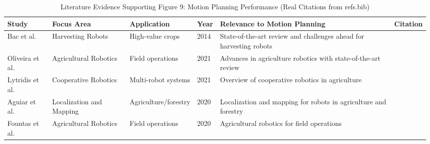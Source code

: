 \begin{table*}[htbp]
\centering
\small
\caption{Literature Evidence Supporting Figure 9: Motion Planning Performance (Real Citations from refs.bib)}
\label{tab:figure9_real_support}
\begin{tabular}{p{}p{}p{}p{}p{}p{}}
\toprule
\textbf{Study} & \textbf{Focus Area} & \textbf{Application} & \textbf{Year} & \textbf{Relevance to Motion Planning} & \textbf{Citation} \\ \midrule

Bac et al. & Harvesting Robots & High-value crops & 2014 & State-of-the-art review and challenges ahead for harvesting robots & \cite{bac2014harvesting} \\

Oliveira et al. & Agricultural Robotics & Field operations & 2021 & Advances in agriculture robotics with state-of-the-art review & \cite{oliveira2021advances} \\

Lytridis et al. & Cooperative Robotics & Multi-robot systems & 2021 & Overview of cooperative robotics in agriculture & \cite{lytridis2021overview} \\

Aguiar et al. & Localization and Mapping & Agriculture/forestry & 2020 & Localization and mapping for robots in agriculture and forestry & \cite{aguiar2020localization} \\

Fountas et al. & Agricultural Robotics & Field operations & 2020 & Agricultural robotics for field operations & \cite{fountas2020agricultural} \\

\bottomrule
\end{tabular}
\end{table*}

